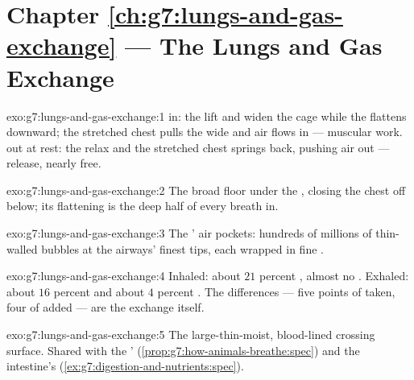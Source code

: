 \section*{Chapter \ref{ch:g7:lungs-and-gas-exchange} --- The Lungs and Gas Exchange}

\begin{solution}{exo:g7:lungs-and-gas-exchange:1}
 in: the   lift and widen the cage while
the  flattens downward; the stretched chest pulls
the  wide and air flows in --- muscular work.
 out at rest: the  relax and the stretched
chest springs back, pushing air out --- release, nearly
free.
\end{solution}

\begin{solution}{exo:g7:lungs-and-gas-exchange:2}
The broad  floor under the , closing the chest
off below; its flattening is the deep half of every
breath in.
\end{solution}

\begin{solution}{exo:g7:lungs-and-gas-exchange:3}
The ' air pockets: hundreds of millions of thin-walled
bubbles at the airways' finest tips, each wrapped in fine
.
\end{solution}

\begin{solution}{exo:g7:lungs-and-gas-exchange:4}
Inhaled: about $21$ percent , almost no . Exhaled: about $16$ percent  and about $4$
percent . The differences --- five points of
 taken, four of  added --- are the
exchange itself.
\end{solution}

\begin{solution}{exo:g7:lungs-and-gas-exchange:5}
The large-thin-moist, blood-lined crossing surface. Shared
with the ' 
(\cref{prop:g7:how-animals-breathe:spec}) and the
intestine's 
(\cref{ex:g7:digestion-and-nutrients:spec}).
\end{solution}

